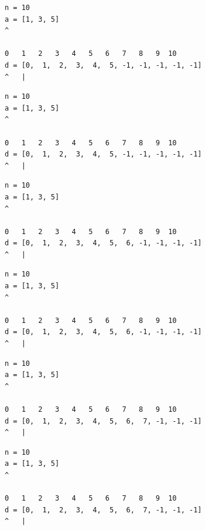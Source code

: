 \begin{frame}[fragile]
\begin{verbatim}
n = 10
a = [1, 3, 5]
^

0   1   2   3   4   5   6   7   8   9  10
d = [0,  1,  2,  3,  4,  5, -1, -1, -1, -1, -1]
^   |
\end{verbatim}
\end{frame}
\addtocounter{framenumber}{-1}

\begin{frame}[fragile]
\begin{verbatim}
n = 10
a = [1, 3, 5]
^

0   1   2   3   4   5   6   7   8   9  10
d = [0,  1,  2,  3,  4,  5, -1, -1, -1, -1, -1]
^   |
\end{verbatim}
\end{frame}
\addtocounter{framenumber}{-1}

\begin{frame}[fragile]
\begin{verbatim}
n = 10
a = [1, 3, 5]
^

0   1   2   3   4   5   6   7   8   9  10
d = [0,  1,  2,  3,  4,  5,  6, -1, -1, -1, -1]
^   |
\end{verbatim}
\end{frame}
\addtocounter{framenumber}{-1}

\begin{frame}[fragile]
\begin{verbatim}
n = 10
a = [1, 3, 5]
^

0   1   2   3   4   5   6   7   8   9  10
d = [0,  1,  2,  3,  4,  5,  6, -1, -1, -1, -1]
^   |
\end{verbatim}
\end{frame}
\addtocounter{framenumber}{-1}

\begin{frame}[fragile]
\begin{verbatim}
n = 10
a = [1, 3, 5]
^

0   1   2   3   4   5   6   7   8   9  10
d = [0,  1,  2,  3,  4,  5,  6,  7, -1, -1, -1]
^   |
\end{verbatim}
\end{frame}
\addtocounter{framenumber}{-1}

\begin{frame}[fragile]
\begin{verbatim}
n = 10
a = [1, 3, 5]
^

0   1   2   3   4   5   6   7   8   9  10
d = [0,  1,  2,  3,  4,  5,  6,  7, -1, -1, -1]
^   |
\end{verbatim}
\end{frame}
\addtocounter{framenumber}{-1}

